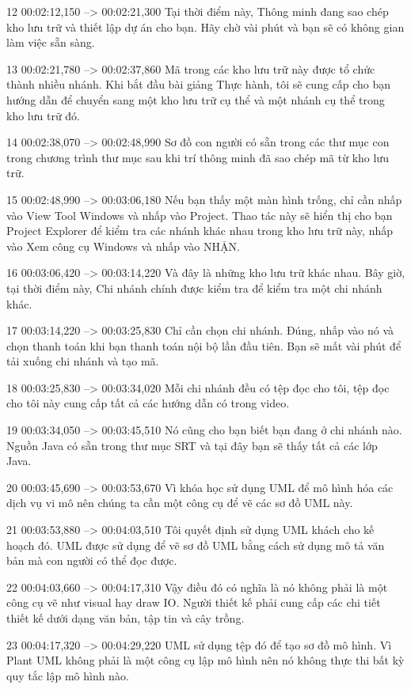 12
00:02:12,150 --> 00:02:21,300
Tại thời điểm này, Thông minh đang sao chép kho lưu trữ và thiết lập dự án cho bạn.  Hãy chờ vài phút và bạn sẽ có không gian làm việc sẵn sàng.

13
00:02:21,780 --> 00:02:37,860
Mã trong các kho lưu trữ này được tổ chức thành nhiều nhánh.  Khi bắt đầu bài giảng Thực hành, tôi sẽ cung cấp cho bạn hướng dẫn để chuyển sang một kho lưu trữ cụ thể và một nhánh cụ thể trong kho lưu trữ đó.

14
00:02:38,070 --> 00:02:48,990
Sơ đồ con người có sẵn trong các thư mục con trong chương trình thư mục sau khi trí thông minh đã sao chép mã từ kho lưu trữ.

15
00:02:48,990 --> 00:03:06,180
Nếu bạn thấy một màn hình trống, chỉ cần nhấp vào View Tool Windows và nhấp vào Project.  Thao tác này sẽ hiển thị cho bạn Project Explorer để kiểm tra các nhánh khác nhau trong kho lưu trữ này, nhấp vào Xem công cụ Windows và nhấp vào NHẬN.

16
00:03:06,420 --> 00:03:14,220
Và đây là những kho lưu trữ khác nhau.  Bây giờ, tại thời điểm này, Chi nhánh chính được kiểm tra để kiểm tra một chi nhánh khác.

17
00:03:14,220 --> 00:03:25,830
Chỉ cần chọn chi nhánh.  Đúng, nhấp vào nó và chọn thanh toán khi bạn thanh toán nội bộ lần đầu tiên. Bạn sẽ mất vài phút để tải xuống chi nhánh và tạo mã.

18
00:03:25,830 --> 00:03:34,020
Mỗi chi nhánh đều có tệp đọc cho tôi, tệp đọc cho tôi này cung cấp tất cả các hướng dẫn có trong video.

19
00:03:34,050 --> 00:03:45,510
Nó cũng cho bạn biết bạn đang ở chi nhánh nào.  Nguồn Java có sẵn trong thư mục SRT và tại đây bạn sẽ thấy tất cả các lớp Java.

20
00:03:45,690 --> 00:03:53,670
Vì khóa học sử dụng UML để mô hình hóa các dịch vụ vi mô nên chúng ta cần một công cụ để vẽ các sơ đồ UML này.

21
00:03:53,880 --> 00:04:03,510
Tôi quyết định sử dụng UML khách cho kế hoạch đó.  UML được sử dụng để vẽ sơ đồ UML bằng cách sử dụng mô tả văn bản mà con người có thể đọc được.

22
00:04:03,660 --> 00:04:17,310
Vậy điều đó có nghĩa là nó không phải là một công cụ vẽ như visual hay draw IO.  Người thiết kế phải cung cấp các chi tiết thiết kế dưới dạng văn bản, tập tin và cây trồng.

23
00:04:17,320 --> 00:04:29,220
UML sử dụng tệp đó để tạo sơ đồ mô hình.  Vì Plant UML không phải là một công cụ lập mô hình nên nó không thực thi bất kỳ quy tắc lập mô hình nào.

